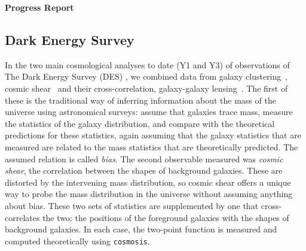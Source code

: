\documentclass[12pt]{article}
\newcommand\cosmosis{{\tt cosmosis}}
\begin{document}
\topmargin=-2.105cm
\oddsidemargin=-0.1cm
\evensidemargin=0cm

\begin{center}
{\bf Progress Report\\}
\end{center}

\begin{small}



\section{Dark Energy Survey}

In the two main cosmological analyses to date (Y1 and Y3) of observations of The Dark Energy Survey (DES) \cite{Abbott:2017wau}, we combined data from galaxy clustering~\cite{Elvin-Poole:2017xsf}, cosmic shear~\cite{Troxel:2017xyo} and their cross-correlation, galaxy-galaxy lensing~\cite{Prat:2017goa}. The first of these is the traditional way of inferring information about the mass of the universe using astronomical surveys: assume that galaxies trace mass, measure the statistics of the galaxy distribution, and compare with the theoretical predictions for these statistics, again assuming that the galaxy statistics that are measured are related to the mass statistics that are theoretically predicted. The assumed relation is called \emph{bias}. The second observable measured was \emph{cosmic shear}, the correlation between the shapes of background galaxies. These are distorted by the intervening mass distribution, so cosmic shear offers a unique way to probe the mass distribution in the universe without assuming anything about bias. These two sets of statistics are supplemented by one that cross-correlates the two: the positions of the foreground galaxies with the shapes of background galaxies. In each case, the two-point function is measured and computed theoretically using \cosmosis. 


\end{small}
\end{document}
